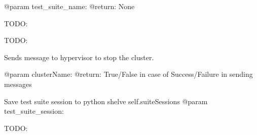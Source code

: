 \documentclass[letterpaper,10pt,english]{sphinxmanual}
\begin{document}
\begin{fulllineitems}
\begin{fulllineitems}
@param test\_suite\_name:
@return: None

\end{fulllineitems}


\begin{fulllineitems}
\label{ref-manual/XrdTestMaster:XrdTestMaster.XrdTestMaster.startTCPServer}
TODO:

\end{fulllineitems}


\begin{fulllineitems}
\label{ref-manual/XrdTestMaster:XrdTestMaster.XrdTestMaster.startWebInterface}
TODO:

\end{fulllineitems}


\begin{fulllineitems}
\label{ref-manual/XrdTestMaster:XrdTestMaster.XrdTestMaster.stopCluster}
Sends message to hypervisor to stop the cluster.

@param clusterName:
@return: True/False in case of Success/Failure in sending messages

\end{fulllineitems}


\begin{fulllineitems}
\label{ref-manual/XrdTestMaster:XrdTestMaster.XrdTestMaster.storeSuiteSession}
Save test suite session to python shelve self.suiteSessions
@param test\_suite\_session:

\end{fulllineitems}


\begin{fulllineitems}
\label{ref-manual/XrdTestMaster:XrdTestMaster.XrdTestMaster.watchDirectories}
TODO:

\end{fulllineitems}


\end{fulllineitems}
\end{document}
